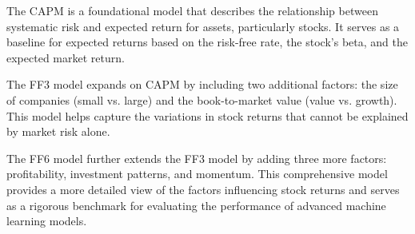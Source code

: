 \documentclass{article}
\begin{document}
The CAPM is a foundational model that describes the relationship between systematic risk and expected return for assets, particularly stocks. It serves as a baseline for expected returns based on the risk-free rate, the stock's beta, and the expected market return.

The FF3 model expands on CAPM by including two additional factors: the size of companies (small vs. large) and the book-to-market value (value vs. growth). This model helps capture the variations in stock returns that cannot be explained by market risk alone.

The FF6 model further extends the FF3 model by adding three more factors: profitability, investment patterns, and momentum. This comprehensive model provides a more detailed view of the factors influencing stock returns and serves as a rigorous benchmark for evaluating the performance of advanced machine learning models.
\end{document}
